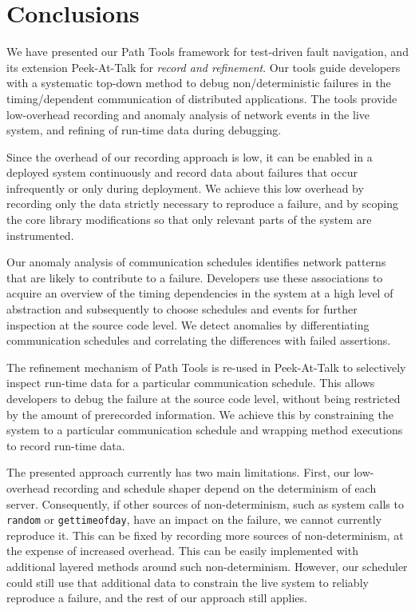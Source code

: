 \documentclass[preprint,3p]{elsarticle}
\newcommand{\toolname}{Peek-At-Talk\xspace}
\newcommand{\todo}[1]{\framebox{\textsc{todo} #1}}
\begin{document}

\section{Conclusions}
\label{sec:conclusions}

We have presented our Path Tools framework for test-driven fault 
navigation, and its extension \toolname for \emph{record and
  refinement}.  Our tools guide developers with a systematic top-down
method to debug non\-/deterministic failures in the timing\-/dependent
communication of distributed applications. The tools provide
low-overhead recording and anomaly analysis of network events in the
live system, and refining of run-time data during
debugging.

Since the overhead of our recording approach is low, it can be enabled
in a deployed system continuously and record data about failures that
occur infrequently or only during deployment. We achieve this low
overhead by recording only the data strictly necessary to reproduce a
failure, and by scoping the core library modifications so that only
relevant parts of the system are instrumented.

Our anomaly analysis of communication schedules identifies network
patterns that are likely to contribute to a failure. Developers use
these associations to acquire an overview of the timing dependencies
in the system at a high level of abstraction and subsequently to
choose schedules and events for further inspection at the source code
level. We detect anomalies by differentiating communication schedules
and correlating the differences with failed assertions.

The refinement mechanism of Path Tools is re-used in \toolname to
selectively inspect run-time data for a particular communication
schedule. This allows developers to debug the failure at the source
code level, without being restricted by the amount of prerecorded
information. We achieve this by constraining the system to a
particular communication schedule and wrapping method executions to
record run-time data.

The presented approach currently has two main limitations. First, our
low-overhead recording and schedule shaper depend on the determinism of each
server. Consequently, if other sources of non-determinism, such as system calls
to \texttt{random} or \texttt{gettimeofday}, have an impact on the failure, we
cannot currently reproduce it. This can be fixed by recording more sources of
non-determinism, at the expense of increased overhead. This can be easily
implemented with additional layered methods around such
non-determinism. However, our scheduler could still use that additional data to
constrain the live system to reliably reproduce a failure, and the rest of our
approach still applies.
\end{document}
